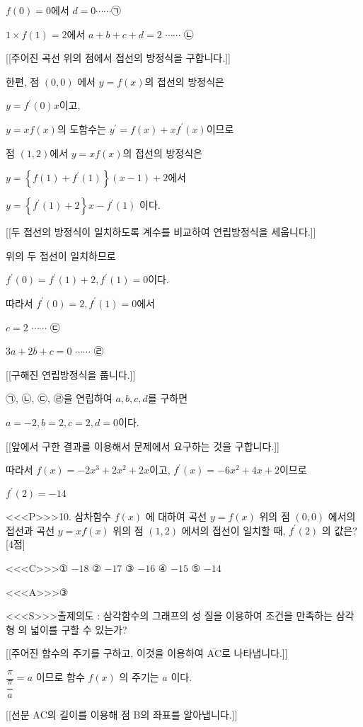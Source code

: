 \documentclass{oblivoir}
\begin{document}
$f(0)=0$에서  $d=0 \cdots \cdots $㉠

$1 \times f(1)=2$에서  $a+b+c+d=2$ $\cdots \cdots$ ㉡

[[주어진 곡선 위의 점에서 접선의 방정식을 구합니다.]]

한편, 점 $(0,0)$ 에서 $y=f(x)$의 접선의 방정식은

$y=f^{\prime}(0) x$이고,

$y=x f(x)$의 도함수는 $y^{\prime}=f(x)+x f^{\prime}(x)$이므로

점 $(1,2)$에서 $y=x f(x)$의 접선의 방정식은

$y=\left\{f(1)+f^{\prime}(1)\right\}(x-1)+2$에서

$y=\left\{f^{\prime}(1)+2\right\} x-f^{\prime}(1) $ 이다.

[[두 접선의 방정식이 일치하도록 계수를 비교하여 연립방정식을 세웁니다.]]

위의 두 접선이 일치하므로

$f^{\prime}(0)=f^{\prime}(1)+2, f^{\prime}(1)=0$이다.

따라서 $f^{\prime}(0)=2, f^{\prime}(1)=0$에서

$c=2$  $\cdots \cdots$ ㉢

$3 a+2 b+c=0$  $\cdots \cdots$ ㉣

[[구해진 연립방정식을 풉니다.]]

㉠, ㉡, ㉢, ㉣을 연립하여 $a,b,c,d$를 구하면

$a=-2, b=2, c=2, d=0$이다.

[[앞에서 구한 결과를 이용해서 문제에서 요구하는 것을 구합니다.]]

따라서 $f(x)=-2 x^{3}+2 x^{2}+2 x$이고, $f^{\prime}(x)=-6 x^{2}+4 x+2$이므로

$f^{\prime}(2)=-14$


<<<P>>>10. 삼차함수 $f(x)$ 에 대하여 곡선 $y=f(x)$ 위의 점 $(0,0)$ 에서의 접선과 곡선 $y=x f(x)$ 위의 점 $(1,2)$ 에서의 접선이 일치할 때, $f^{\prime}(2)$ 의 값은? [4점]

<<<C>>>① $-18$
② $-17$
③ $-16$
④ $-15$
⑤ $-14$


<<<A>>>③

<<<S>>>출제의도 : 삼각함수의 그래프의 성 질을 이용하여 조건을 만족하는 삼각형 의 넓이를 구할 수 있는가?

[[주어진 함수의 주기를 구하고, 이것을 이용하여 $\overline{\mathrm{AC}}$로 나타냅니다.]]

$\dfrac{\pi}{\dfrac{\pi}{a}}=a$ 이므로
함수 $f(x)$ 의 주기는 $a$ 이다.

[[선분 $\mathrm{AC}$의 길이를 이용해 점 $\mathrm{B}$의 좌표를 알아냅니다.]]
\end{document}
